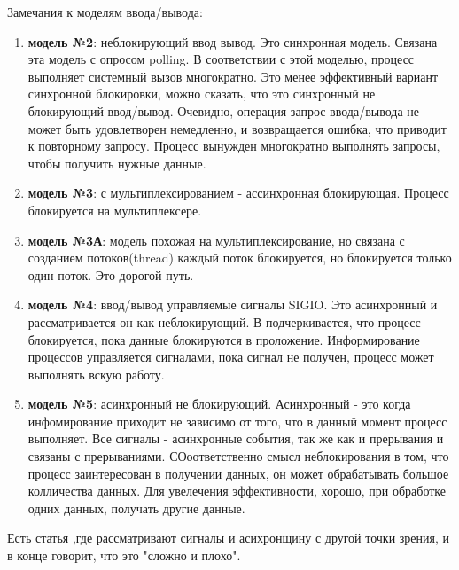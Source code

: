 Замечания к моделям ввода/вывода:
\begin{enumerate}
	\item \textbf{модель №2}: неблокирующий ввод вывод. Это синхронная модель. Связана эта модель с опросом polling. В соответствии с этой моделью, процесс выполняет системный вызов многократно. Это менее эффективный вариант синхронной блокировки, можно сказать, что это синхронный не блокирующий ввод/вывод. Очевидно, операция запрос ввода/вывода не может быть удовлетворен немедленно, и возвращается ошибка, что приводит к повторному запросу. Процесс вынужден многократно выполнять запросы, чтобы получить нужные данные.

	\item \textbf{модель №3}: с мультиплексированием - ассинхронная блокирующая. Процесс блокируется на мультиплексере.  

	\item \textbf{модель №3А}: модель похожая на мультиплексирование, но связана с созданием потоков(thread) каждый поток блокируется, но блокируется только один поток. Это дорогой путь.

	\item \textbf{модель №4}: ввод/вывод управляемые сигналы SIGIO. Это асинхронный и рассматривается он как неблокирующий. В \cite{UNIX_Stiv_net_app} подчеркивается, что процесс блокируется, пока данные блокируются в проложение. Информирование процессов управляется сигналами, пока сигнал не получен, процесс может выполнять вскую работу.

	\item \textbf{модель №5}: асинхронный не блокирующий. Асинхронный - это когда инфомирование приходит не зависимо от того, что в данный момент процесс выполняет. Все сигналы - асинхронные события, так же как и прерывания и связаны с прерываниями. СОоответственно смысл неблокирования в том, что процесс заинтересован в получении данных, он может обрабатывать большое колличества данных. Для увелечения эффективности, хорошо, при обработке одних данных, получать другие данные.
\end{enumerate}

Есть статья \cite{David_async},где рассматривают сигналы и асихронщину с другой точки зрения, и в конце говорит, что это "сложно и плохо".
